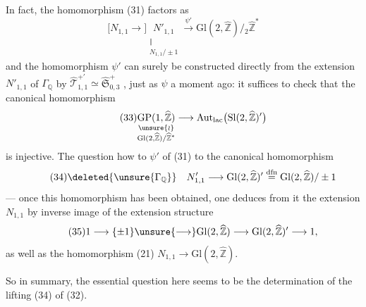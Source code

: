 

In fact, the homomorphism (31) factors as
\[
\tag{31}
\bigl[N_{1,1}\longrightarrow\bigr]
\underset{\substack{\Vert\\N_{1,1}/\pm1}}{N'_{1,1}}
\xrightarrow{\psi'}\mathrm{Gl}(2,\widehat{\mathbb Z})/{}_{2}\widehat{\mathbb Z}^{*}
\]
and the homomorphism $\psi'$ can surely be constructed directly from the extension
$N'_{1,1}$ of $\Gamma_{\mathbb Q}$ by
$\widehat{\mathcal T}_{1,1}^{+\prime}\simeq\widehat{\mathfrak S}_{0,3}^{+}$
, just as $\psi$ a moment ago:
it suffices to check that the canonical homomorphism
\[
\tag{33}
\underset{\substack{\unsure{\wr}\\\mathrm{Gl}(2,\widehat{\mathbb Z})/\widehat{\mathbb Z}^{*}}}{\mathrm{GP}(1,\widehat{\mathbb Z})}
\longrightarrow\mathrm{Aut}_{\mathrm{lac}}\bigl(\mathrm{Sl}(2,\widehat{\mathbb Z})'\bigr)
\]
is  injective. The question 
how to 
$\psi'$ of (31) to the canonical homomorphism
\[
\tag{34}
\deleted{\unsure{\Gamma_{\mathbb Q}}}\quad
N'_{1,1}\longrightarrow\mathrm{Gl}(2,\widehat{\mathbb Z})'
\overset{\mathrm{dfn}}{=}\mathrm{Gl}(2,\widehat{\mathbb Z})/\pm1
\]
--- once this homomorphism has been obtained, one deduces from it the extension $N_{1,1}$ by inverse image
of the extension structure
\[
\tag{35}
1\longrightarrow\{\pm1\}\unsure{\longrightarrow}\mathrm{Gl}(2,\widehat{\mathbb Z})
\longrightarrow\mathrm{Gl}(2,\widehat{\mathbb Z})'\longrightarrow1,
\]
as well as the homomorphism (21) $N_{1,1}\longrightarrow\mathrm{Gl}(2,\widehat{\mathbb Z})$.



So in summary, the essential question here seems to be the determination of the lifting (34) of (32).

